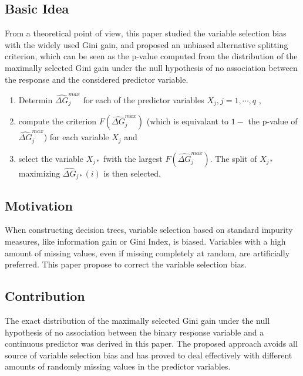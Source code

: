 \documentclass[a4paper]{article}
\begin{document}
        \subsection{Basic Idea}
        From a theoretical point of view, this paper studied the variable selection bias with the widely used Gini gain, and proposed an unbiased alternative splitting criterion, which can be seen as the p-value computed from the distribution of the maximally selected Gini gain under the null hypothesis of no association between the response and the considered predictor variable.
        \begin{enumerate}
            \item Determin $ \widehat{\Delta G}_j^{max} $ for each of the predictor variables $ X_j, j = 1, \cdots, q$ ,
            \item compute the criterion $ F(\widehat{\Delta G}_j^{max}) $ (which is equivalant to $ 1- $ the p-value of $ \widehat{\Delta G}_j^{max} $) for each variable $ X_j $ and
            \item select the variable $ X_{j*} $ fwith the largest $ F(\widehat{\Delta G}_j^{max}) $. The split of $ X_{j*} $ maximizing $ \widehat{\Delta G}_{j*}(i) $ is then selected.
        \end{enumerate}

        \subsection{Motivation}
        When constructing decision trees, variable selection based on standard impurity measures, like information gain or Gini Index, is biased. Variables with a high amount of missing values, even if missing completely at random, are artificially preferred. This paper propose to correct the variable selection bias.

        \subsection{Contribution}
        The exact distribution of the maximally selected Gini gain under the null hypothesis of no association between the binary response variable and a continuous predictor was derived in this paper. The proposed approach avoids all source of variable selection bias and has proved to deal effectively with different amounts of randomly missing values in the predictor variables.
        
\end{document}
